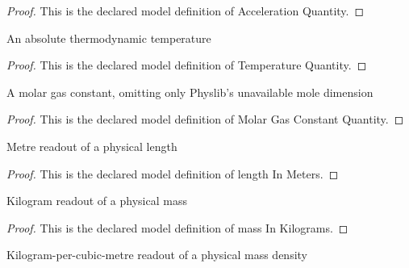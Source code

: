 \begin{proof}
  This is the declared model definition of Acceleration Quantity.
\end{proof}
\begin{definition}
  \label{def:physics:phyx-mini-0407:phyxminiproblems-problemphyxmini0407-temperaturequantity}
  An absolute thermodynamic temperature
\end{definition}
\begin{proof}
  This is the declared model definition of Temperature Quantity.
\end{proof}
\begin{definition}
  \label{def:physics:phyx-mini-0407:phyxminiproblems-problemphyxmini0407-molargasconstantquantity}
  A molar gas constant, omitting only Physlib's unavailable mole dimension
\end{definition}
\begin{proof}
  This is the declared model definition of Molar Gas Constant Quantity.
\end{proof}
\begin{definition}
  \label{def:physics:phyx-mini-0407:phyxminiproblems-problemphyxmini0407-lengthinmeters}
  Metre readout of a physical length
\end{definition}
\begin{proof}
  This is the declared model definition of length In Meters.
\end{proof}
\begin{definition}
  \label{def:physics:phyx-mini-0407:phyxminiproblems-problemphyxmini0407-massinkilograms}
  Kilogram readout of a physical mass
\end{definition}
\begin{proof}
  This is the declared model definition of mass In Kilograms.
\end{proof}
\begin{definition}
  \label{def:physics:phyx-mini-0407:phyxminiproblems-problemphyxmini0407-massdensityinkilogramspercubicmeter}
  Kilogram-per-cubic-metre readout of a physical mass density
\end{definition}

